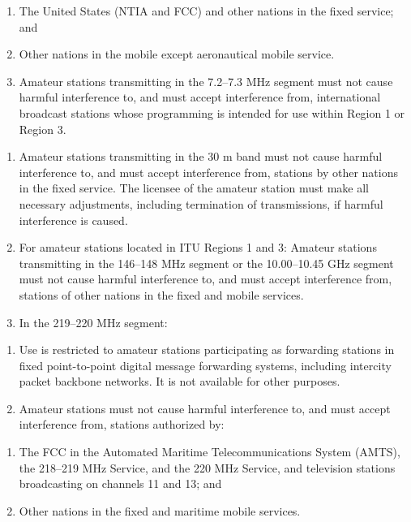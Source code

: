\documentclass[
  letterpaper,
  DIV=11,
  numbers=noendperiod]{scrreport}
\begin{document}
\begin{enumerate}
\def\labelenumi{(\roman{enumi})}
\item
  The United States (NTIA and FCC) and other nations in the fixed
  service; and
\item
  Other nations in the mobile except aeronautical mobile service.
\item
  Amateur stations transmitting in the 7.2--7.3 MHz segment must not
  cause harmful interference to, and must accept interference from,
  international broadcast stations whose programming is intended for use
  within Region 1 or Region 3.
\end{enumerate}

\begin{enumerate}
\def\labelenumi{(\alph{enumi})}
\setcounter{enumi}{9}
\item
  Amateur stations transmitting in the 30 m band must not cause harmful
  interference to, and must accept interference from, stations by other
  nations in the fixed service. The licensee of the amateur station must
  make all necessary adjustments, including termination of
  transmissions, if harmful interference is caused.
\item
  For amateur stations located in ITU Regions 1 and 3: Amateur stations
  transmitting in the 146--148 MHz segment or the 10.00--10.45 GHz
  segment must not cause harmful interference to, and must accept
  interference from, stations of other nations in the fixed and mobile
  services.
\item
  In the 219--220 MHz segment:
\end{enumerate}

\begin{enumerate}
\def\labelenumi{(\arabic{enumi})}
\item
  Use is restricted to amateur stations participating as forwarding
  stations in fixed point-to-point digital message forwarding systems,
  including intercity packet backbone networks. It is not available for
  other purposes.
\item
  Amateur stations must not cause harmful interference to, and must
  accept interference from, stations authorized by:
\end{enumerate}

\begin{enumerate}
\def\labelenumi{(\roman{enumi})}
\item
  The FCC in the Automated Maritime Telecommunications System (AMTS),
  the 218--219 MHz Service, and the 220 MHz Service, and television
  stations broadcasting on channels 11 and 13; and
\item
  Other nations in the fixed and maritime mobile services.
\end{enumerate}
\end{document}
